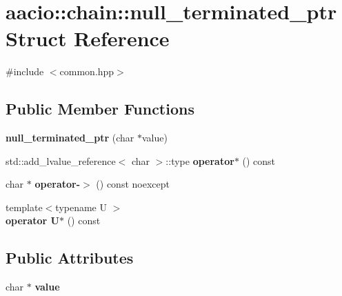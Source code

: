\hypertarget{structaacio_1_1chain_1_1null__terminated__ptr}{}\section{aacio\+:\+:chain\+:\+:null\+\_\+terminated\+\_\+ptr Struct Reference}
\label{structaacio_1_1chain_1_1null__terminated__ptr}


{\ttfamily \#include $<$common.\+hpp$>$}

\subsection*{Public Member Functions}
\begin{DoxyCompactItemize}
\item 
\mbox{\label{structaacio_1_1chain_1_1null__terminated__ptr_a7f3dfd723a7aeb2c5740eb38f363e33a}} 
{\bfseries null\+\_\+terminated\+\_\+ptr} (char $\ast$value)
\item 
\mbox{\label{structaacio_1_1chain_1_1null__terminated__ptr_a5fcf134df8273e185bb7f67e6c389453}} 
std\+::add\+\_\+lvalue\+\_\+reference$<$ char $>$\+::type {\bfseries operator$\ast$} () const
\item 
\mbox{\label{structaacio_1_1chain_1_1null__terminated__ptr_ae5b756386f8993db6898ed559511ee32}} 
char $\ast$ {\bfseries operator-\/$>$} () const noexcept
\item 
\mbox{\label{structaacio_1_1chain_1_1null__terminated__ptr_a3cad86780a73e57d0c96910b30182ecb}} 
{\footnotesize template$<$typename U $>$ }\\{\bfseries operator U$\ast$} () const
\end{DoxyCompactItemize}
\subsection*{Public Attributes}
\begin{DoxyCompactItemize}
\item 
\mbox{\label{structaacio_1_1chain_1_1null__terminated__ptr_a21ed120d5368042e7929ec890960368c}} 
char $\ast$ {\bfseries value}
\end{DoxyCompactItemize}



